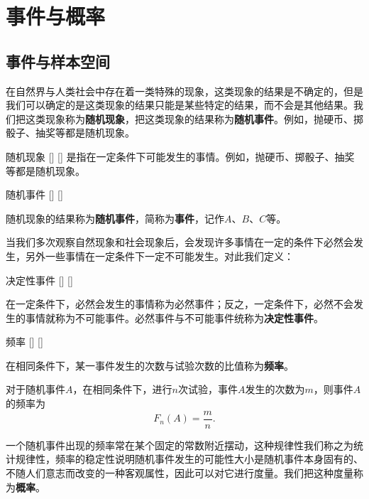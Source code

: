 \documentclass[UTF8]{ctexart}
\begin{document}
\tableofcontents
\newpage

\section{事件与概率}

    \subsection{事件与样本空间}

        在自然界与人类社会中存在着一类特殊的现象，这类现象的结果是不确定的，但是我们可以确定的是这类现象的结果只能是某些特定的结果，而不会是其他结果。我们把这类现象称为\textbf{随机现象}，把这类现象的结果称为\textbf{随机事件}。例如，抛硬币、掷骰子、抽奖等都是随机现象。

        \begin{dfn}
            []
            {随机现象}
            []
            []
            是指在一定条件下可能发生的事情。例如，抛硬币、掷骰子、抽奖等都是随机现象。
        \end{dfn}

        \begin{dfn}
            []
            {随机事件}
            []
            []

    
            随机现象的结果称为\textbf{随机事件}，简称为\textbf{事件}，记作$A$、$B$、$C$等。
        \end{dfn}
        当我们多次观察自然现象和社会现象后，会发现许多事情在一定的条件下必然会发生，另外一些事情在一定条件下一定不可能发生。对此我们定义：
        \begin{dfn}
            []
            {决定性事件}
            []
            []

    
            在一定条件下，必然会发生的事情称为必然事件；反之，一定条件下，必然不会发生的事情就称为不可能事件。必然事件与不可能事件统称为\textbf{决定性事件}。
        \end{dfn}
        \begin{dfn}
            []
            {频率}
            []
            []


            在相同条件下，某一事件发生的次数与试验次数的比值称为\textbf{频率}。

            对于随机事件$A$，在相同条件下，进行$n$次试验，事件$A$发生的次数为$m$，则事件$A$的频率为\[F_n(A)=\frac{m}{n}.\]
        \end{dfn}

        一个随机事件出现的频率常在某个固定的常数附近摆动，这种规律性我们称之为统计规律性，频率的稳定性说明随机事件发生的可能性大小是随机事件本身固有的、不随人们意志而改变的一种客观属性，因此可以对它进行度量。我们把这种度量称为\textbf{概率}。
\end{document}
